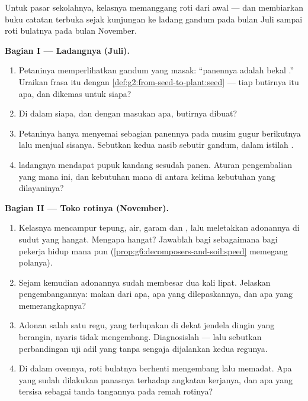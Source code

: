 \begin{problem}\label{pb:g6:producing-our-food:1}
Untuk pasar sekolahnya, kelasnya memanggang roti dari awal --- dan
membiarkan buku catatan  terbuka sejak kunjungan ke ladang
gandum pada bulan Juli sampai roti bulatnya pada bulan November.

\medskip\noindent\textbf{Bagian I --- Ladangnya (Juli).}
\begin{enumerate}
  \item Petaninya memperlihatkan gandum yang masak: ``panennya adalah
        bekal .'' Uraikan frasa itu dengan
        \cref{def:g2:from-seed-to-plant:seed} --- tiap butirnya itu
        apa, dan dikemas untuk siapa?
  \item Di dalam  siapa, dan dengan masukan apa, 
        butirnya dibuat?
  \item Petaninya hanya menyemai sebagian panennya pada musim gugur
        berikutnya lalu menjual sisanya. Sebutkan kedua nasib sebutir
        gandum, dalam istilah .
  \item {} ladangnya mendapat pupuk kandang sesudah panen. Aturan
        pengembalian yang mana ini, dan kebutuhan mana di antara
        kelima kebutuhan  yang dilayaninya?
\end{enumerate}

\medskip\noindent\textbf{Bagian II --- Toko rotinya (November).}
\begin{enumerate}[resume]
  \item Kelasnya mencampur tepung, air, garam dan , lalu meletakkan
        adonannya di sudut yang hangat. Mengapa hangat? Jawablah bagi
         sebagaimana bagi pekerja hidup mana pun
        (\cref{prop:g6:decomposers-and-soil:speed} memegang polanya).
  \item Sejam kemudian adonannya sudah membesar dua kali lipat.
        Jelaskan pengembangannya:  makan dari apa, apa yang
        dilepaskannya, dan apa yang memerangkapnya?
  \item Adonan salah satu regu, yang terlupakan di dekat jendela dingin
        yang berangin, nyaris tidak mengembang. Diagnosislah --- lalu
        sebutkan perbandingan uji adil yang tanpa sengaja dijalankan
        kedua regunya.
  \item Di dalam ovennya, roti bulatnya berhenti mengembang lalu
        memadat. Apa yang sudah dilakukan panasnya terhadap angkatan
        kerjanya, dan apa yang tersisa sebagai tanda tangannya pada
        remah rotinya?
\end{enumerate}


\end{problem}
